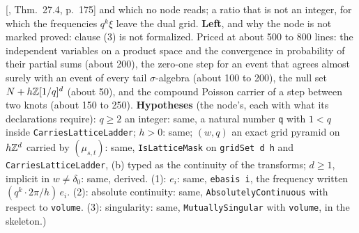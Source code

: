 \begin{proposition}
{[, Thm.~27.4, p.~175] and which no node reads; a ratio that is not an integer,
for which the frequencies $q^k\xi$ leave the dual grid. \textbf{Left}, and why the node is not
marked proved: clause (3) is not formalized. Priced at about 500 to 800 lines: the independent
variables on a product space and the convergence in probability of their partial sums (about 200),
the zero-one step for an event that agrees almost surely with an event of every tail $\sigma$-algebra
(about 100 to 200), the null set $N + h\mathbb{Z}[1/q]^d$ (about 50), and the compound Poisson carrier of
a step between two knots (about 150 to 250). \textbf{Hypotheses} (the node's, each with what its
declarations require): $q \ge 2$ an integer: same, a natural number \texttt{q} with $1 < q$ inside
\texttt{CarriesLatticeLadder}; $h > 0$: same; $(w, q)$ an exact grid pyramid on $h\mathbb{Z}^d$ carried by
$(\mu_{s,t})$: same, \texttt{IsLatticeMask} on \texttt{gridSet d h} and
\texttt{CarriesLatticeLadder}, (b) typed as the continuity of the transforms; $d \ge 1$, implicit in
$w \ne \delta_0$: same, derived. (1): $e_i$: same, \texttt{ebasis i}, the frequency written
$(q^k \cdot 2\pi/h)\,e_i$. (2): absolute continuity: same, \texttt{AbsolutelyContinuous} with respect to
\texttt{volume}. (3): singularity: same, \texttt{MutuallySingular} with \texttt{volume}, in the
skeleton.)}
\end{proposition}

